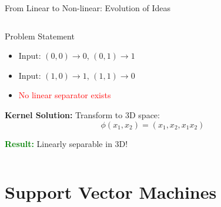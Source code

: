 \documentclass[8pt,aspectratio=1610]{beamer}
\begin{document}
\begin{frame}{From Linear to Non-linear: Evolution of Ideas}
\begin{columns}[t]
\begin{column}{0.48\textwidth}
\vspace{0.2cm}
\begin{block}{Problem Statement}
\begin{itemize}
\setlength{\itemsep}{1pt}
\item Input: $(0,0) \to 0$, $(0,1) \to 1$
\item Input: $(1,0) \to 1$, $(1,1) \to 0$
\item \textcolor{red}{No linear separator exists}
\end{itemize}
\end{block}

\vspace{0.2cm}
\textbf{Kernel Solution:}
Transform to 3D space:
$$\phi(x_1, x_2) = (x_1, x_2, x_1 x_2)$$

\textcolor{green}{\textbf{Result:}} Linearly separable in 3D!
\end{column}
\end{columns}
\end{frame}

\section{Support Vector Machines}
\end{document}
